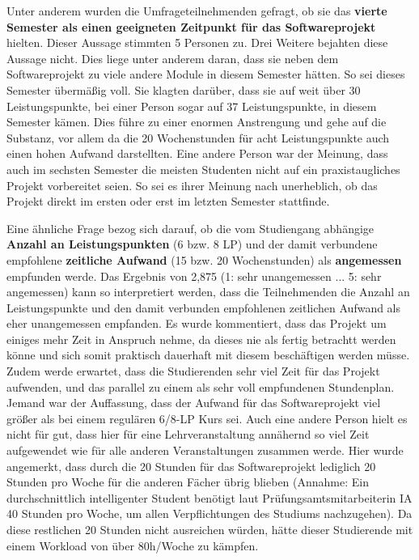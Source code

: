 \documentclass[../review_3.tex]{subfiles}
\begin{document}
Unter anderem wurden die Umfrageteilnehmenden gefragt, ob sie das \textbf{vierte Semester als einen geeigneten Zeitpunkt für das Softwareprojekt} hielten. Dieser Aussage stimmten 5 Personen zu. Drei Weitere bejahten diese Aussage nicht. Dies liege unter anderem daran, dass sie neben dem Softwareprojekt zu viele andere Module in diesem Semester hätten. So sei dieses Semester übermäßig voll. Sie klagten darüber, dass sie auf weit über 30 Leistungspunkte, bei einer Person sogar auf 37 Leistungspunkte, in diesem Semester kämen. Dies führe zu einer enormen Anstrengung und gehe auf die Substanz, vor allem da die 20 Wochenstunden für acht Leistungspunkte auch einen hohen Aufwand darstellten. Eine andere Person war der Meinung, dass auch im sechsten Semester die meisten Studenten nicht auf ein praxistaugliches Projekt vorbereitet seien. So sei es ihrer Meinung nach unerheblich, ob das Projekt direkt im ersten oder erst im letzten Semester stattfinde.

Eine ähnliche Frage bezog sich darauf, ob die vom Studiengang abhängige \textbf{Anzahl an Leistungspunkten} (6 bzw. 8 LP) und der damit verbundene empfohlene \textbf{zeitliche Aufwand} (15 bzw. 20 Wochenstunden) als \textbf{angemessen} empfunden werde. Das Ergebnis von 2,875 (1: sehr unangemessen ... 5: sehr angemessen) kann so interpretiert werden, dass die Teilnehmenden die Anzahl an Leistungspunkte und den damit verbunden empfohlenen zeitlichen Aufwand als eher unangemessen empfanden. Es wurde kommentiert, dass das Projekt um einiges mehr Zeit in Anspruch nehme, da dieses nie als fertig betrachtt werden könne und sich somit praktisch dauerhaft mit diesem beschäftigen werden müsse. Zudem werde erwartet, dass die Studierenden sehr viel Zeit für das Projekt aufwenden, und das parallel zu einem als sehr voll empfundenen Stundenplan. Jemand war der Auffassung, dass der Aufwand für das Softwareprojekt viel größer als bei einem regulären 6/8-LP Kurs sei. Auch eine andere Person hielt es nicht für gut, dass hier für eine Lehrveranstaltung annähernd so viel Zeit aufgewendet wie für alle anderen Veranstaltungen zusammen werde. Hier wurde angemerkt, dass durch die 20 Stunden für das Softwareprojekt lediglich 20 Stunden pro Woche für die anderen Fächer übrig blieben (Annahme: Ein durchschnittlich intelligenter Student benötigt laut Prüfungsamtsmitarbeiterin IA 40 Stunden pro Woche, um allen Verpflichtungen des Studiums nachzugehen). Da diese restlichen 20 Stunden nicht ausreichen würden, hätte dieser Studierende mit einem Workload von über 80h/Woche zu kämpfen.
\end{document}
